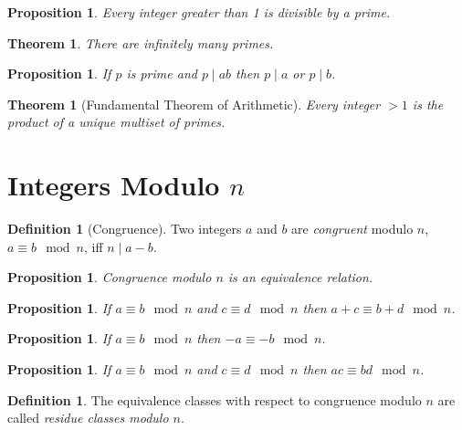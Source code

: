 \documentclass{article}
\newtheorem{proposition}[axiom]{Proposition}
\newtheorem{theorem}[axiom]{Theorem}
\theoremstyle{definition}
\newtheorem{definition}[axiom]{Definition}
\begin{document}
    \begin{proposition}
        Every integer greater than 1 is divisible by a prime.
    \end{proposition}

    \begin{theorem}
        There are infinitely many primes.
    \end{theorem}

    \begin{proposition}
        If $p$ is prime and $p \mid ab$ then $p \mid a$ or $p \mid b$.
    \end{proposition}

    \begin{theorem}[Fundamental Theorem of Arithmetic]
        Every integer $> 1$ is the product of a unique multiset of primes.
    \end{theorem}

    \section{Integers Modulo $n$}

    \begin{definition}[Congruence]
        Two integers $a$ and $b$ are \emph{congruent} modulo $n$, $a \equiv b \mod n$, iff $n \mid a - b$.
    \end{definition}

    \begin{proposition}
        Congruence modulo $n$ is an equivalence relation.
    \end{proposition}

    \begin{proposition}
        If $a \equiv b \mod n$ and $c \equiv d \mod n$ then $a + c \equiv b + d \mod n$.
    \end{proposition}

    \begin{proposition}
        If $a \equiv b \mod n$ then $-a \equiv -b \mod n$.
    \end{proposition}

    \begin{proposition}
        If $a \equiv b \mod n$ and $c \equiv d \mod n$ then $ac \equiv bd \mod n$.
    \end{proposition}

    \begin{definition}
        The equivalence classes with respect to congruence modulo $n$ are called \emph{residue classes modulo $n$}.
    \end{definition}
\end{document}
